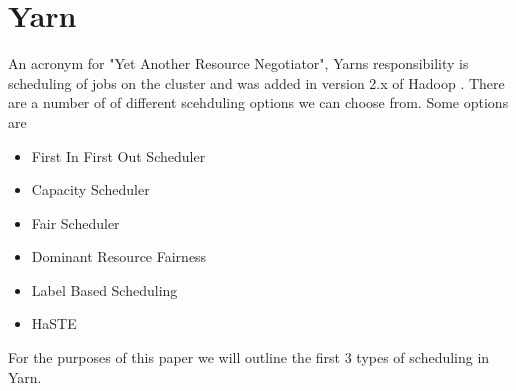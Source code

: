 \section{Yarn}

An acronym for "Yet Another Resource Negotiator", Yarns responsibility is scheduling of jobs on the cluster and was added in version 2.x of Hadoop \cite[pg.1]{yarn-scheduling}. There are a number of of different scehduling options we can choose from. Some options are \cite[pg.2]{yarn-scheduling}

\begin{itemize}
\item First In First Out Scheduler 
\item Capacity Scheduler
\item Fair Scheduler 
\item Dominant Resource Fairness
\item Label Based Scheduling
\item HaSTE
\end{itemize}

For the purposes of this paper we will outline the first 3 types of scheduling in Yarn.